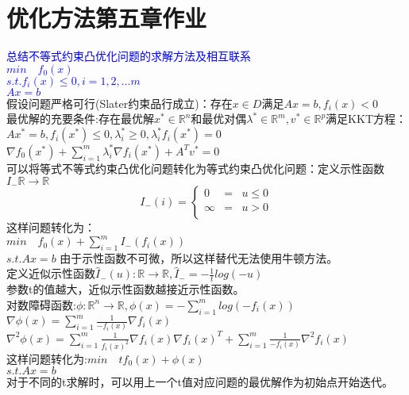 \documentclass{article}
\begin{document}
{\centering\section*{优化方法第五章作业}}
\textcolor{blue}{总结不等式约束凸优化问题的求解方法及相互联系}\\
\textcolor{blue}{$min \quad f_0(x)$\\$s.t.f_i(x) \leq 0, i = 1,2,\dots m$\\$Ax = b$}\\
假设问题严格可行(Slater约束品行成立)：存在$x\in D$满足$Ax = b,f_i(x)< 0$\\
最优解的充要条件:存在最优解$ x^* \in \mathbb{R}^n$和最优对偶$\lambda ^* \in \mathbb{R}^m,v^* \in \mathbb{R}^p$满足KKT方程：\\
$Ax^* = b, f_i(x^*) \leq 0, \lambda_i^* \geq 0, \lambda _i^* f_i(x^*) = 0$\\
$\nabla f_0(x^*) + \sum_{i=1}^{m}  \lambda _i^* \nabla f_i(x^*) + A^Tv^* = 0$\\
可以将等式不等式约束凸优化问题转化为等式约束凸优化问题：定义示性函数$I_{-}\mathbb{R} \rightarrow \mathbb{R}$\\
$$ I_{-}(i)=\left\{
\begin{aligned}
0 & = & u \leq 0 \\
\infty & = & u > 0 \\
\end{aligned}
\right.
$$
这样问题转化为：\\
$min \quad f_0(x) + \sum\limits_{i = 1}^m I_{-}(f_i(x))$\\$s.t.Ax = b$
由于示性函数不可微，所以这样替代无法使用牛顿方法。\\
定义近似示性函数$\hat{I}_-(u):\mathbb{R} \rightarrow \mathbb{R}, \hat{I}_- = -\frac{1}{t}log(-u)$\\
参数t的值越大，近似示性函数越接近示性函数。\\
对数障碍函数:$\phi:\mathbb{R}^n \rightarrow \mathbb{R}, \phi(x) = - \sum_{i=1}^{m}log(-f_i(x))$\\
$\nabla \phi (x) = \sum_{i=1}^{m} \frac{1}{-f_i(x)}\nabla f_i(x)$\\
$\nabla^2 \phi (x) = \sum_{i=1}^{m} \frac{1}{f_i(x)^2}\nabla f_i(x) \nabla f_i(x)^T + \sum_{i=1}^{m} \frac{1}{-f_i(x)}\nabla^2 f_i(x)$\\
这样问题转化为:$min \quad tf_0(x) + \phi(x)$\\$s.t.Ax = b$\\
对于不同的t求解时，可以用上一个t值对应问题的最优解作为初始点开始迭代。\\
\end{document}
